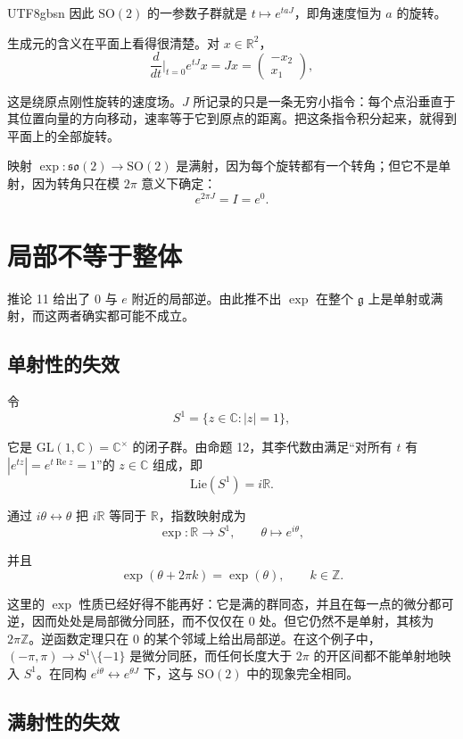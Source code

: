 \documentclass[11pt]{article}
\begin{document}
\begin{CJK*}{UTF8}{gbsn}
因此 $\mathrm{SO}(2)$ 的一参数子群就是 $t \mapsto e^{taJ}$，即角速度恒为 $a$ 的旋转。

生成元的含义在平面上看得很清楚。对 $x \in \mathbb{R}^2$，
\[
\frac{d}{dt}\Big|_{t=0} e^{tJ} x = Jx = \begin{pmatrix} -x_2 \\ x_1 \end{pmatrix},
\]

这是绕原点刚性旋转的速度场。$J$ 所记录的只是一条无穷小指令：每个点沿垂直于其位置向量的方向移动，速率等于它到原点的距离。把这条指令积分起来，就得到平面上的全部旋转。

映射 $\exp : \mathfrak{so}(2) \to \mathrm{SO}(2)$ 是满射，因为每个旋转都有一个转角；但它不是单射，因为转角只在模 $2\pi$ 意义下确定：
\[
e^{2\pi J} = I = e^{0}.
\]

\section{局部不等于整体}

推论 11 给出了 $0$ 与 $e$ 附近的局部逆。由此推不出 $\exp$ 在整个 $\mathfrak{g}$ 上是单射或满射，而这两者确实都可能不成立。

\subsection{单射性的失效}

令
\[
S^1 = \{ z \in \mathbb{C} : |z| = 1 \},
\]

它是 $\mathrm{GL}(1, \mathbb{C}) = \mathbb{C}^\times$ 的闭子群。由命题 12，其李代数由满足“对所有 $t$ 有 $|e^{tz}| = e^{t \operatorname{Re} z} = 1$”的 $z \in \mathbb{C}$ 组成，即
\[
\mathrm{Lie}(S^1) = i\mathbb{R}.
\]

通过 $i\theta \leftrightarrow \theta$ 把 $i\mathbb{R}$ 等同于 $\mathbb{R}$，指数映射成为
\[
\exp : \mathbb{R} \to S^1, \qquad \theta \longmapsto e^{i\theta},
\]

并且
\[
\exp(\theta + 2\pi k) = \exp(\theta), \qquad k \in \mathbb{Z}.
\]

这里的 $\exp$ 性质已经好得不能再好：它是满的群同态，并且在每一点的微分都可逆，因而处处是局部微分同胚，而不仅仅在 $0$ 处。但它仍然不是单射，其核为 $2\pi\mathbb{Z}$。逆函数定理只在 $0$ 的某个邻域上给出局部逆。在这个例子中，$(-\pi, \pi) \to S^1 \setminus \{-1\}$ 是微分同胚，而任何长度大于 $2\pi$ 的开区间都不能单射地映入 $S^1$。在同构 $e^{i\theta} \leftrightarrow e^{\theta J}$ 下，这与 $\mathrm{SO}(2)$ 中的现象完全相同。

\subsection{满射性的失效}


\end{CJK*}
\end{document}
